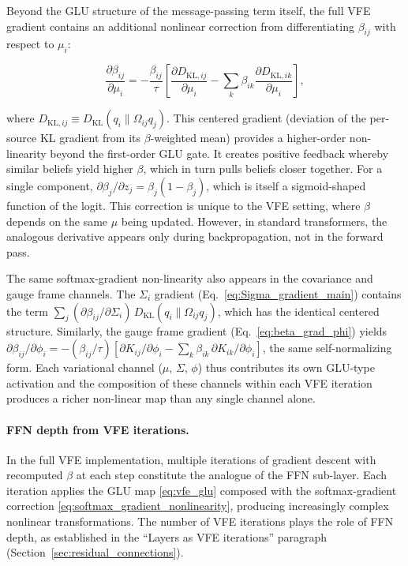 \documentclass[twoside,11pt]{article}
\begin{document}
Beyond the GLU structure of the message-passing term itself, the full VFE gradient contains an additional nonlinear correction from differentiating $\beta_{ij}$ with respect to $\mu_i$:

\begin{equation}
\frac{\partial \beta_{ij}}{\partial \mu_i} = -\frac{\beta_{ij}}{\tau}\left[\frac{\partial D_{\mathrm{KL},ij}}{\partial \mu_i} - \sum_k \beta_{ik} \frac{\partial D_{\mathrm{KL},ik}}{\partial \mu_i}\right],
\label{eq:softmax_gradient_nonlinearity}
\end{equation}

where $D_{\mathrm{KL},ij} \equiv D_{\mathrm{KL}}(q_i \| \Omega_{ij} q_j)$. This centered gradient (deviation of the per-source KL gradient from its $\beta$-weighted mean) provides a higher-order non-linearity beyond the first-order GLU gate. It creates positive feedback whereby similar beliefs yield higher $\beta$, which in turn pulls beliefs closer together. For a single component, $\partial \beta_j / \partial z_j = \beta_j(1 - \beta_j)$, which is itself a sigmoid-shaped function of the logit. This correction is unique to the VFE setting, where $\beta$ depends on the same $\mu$ being updated. However, in standard transformers, the analogous derivative appears only during backpropagation, not in the forward pass.

The same softmax-gradient non-linearity also appears in the covariance and gauge frame channels. The $\Sigma_i$ gradient (Eq.~\ref{eq:Sigma_gradient_main}) contains the term $\sum_j (\partial \beta_{ij}/\partial \Sigma_i)\, D_{\mathrm{KL}}(q_i \| \Omega_{ij} q_j)$, which has the identical centered structure. Similarly, the gauge frame gradient (Eq.~\ref{eq:beta_grad_phi}) yields $\partial \beta_{ij}/\partial \phi_i = -(\beta_{ij}/\tau)[\partial K_{ij}/\partial \phi_i - \sum_k \beta_{ik}\, \partial K_{ik}/\partial \phi_i]$, the same self-normalizing form. Each variational channel ($\mu$, $\Sigma$, $\phi$) thus contributes its own GLU-type activation and the composition of these channels within each VFE iteration produces a richer non-linear map than any single channel alone.

\paragraph{FFN depth from VFE iterations.}
In the full VFE implementation, multiple iterations of gradient descent with recomputed $\beta$ at each step constitute the analogue of the FFN sub-layer. Each iteration applies the GLU map \eqref{eq:vfe_glu} composed with the softmax-gradient correction \eqref{eq:softmax_gradient_nonlinearity}, producing increasingly complex nonlinear transformations. The number of VFE iterations plays the role of FFN depth, as established in the ``Layers as VFE iterations'' paragraph (Section~\ref{sec:residual_connections}).
\end{document}
